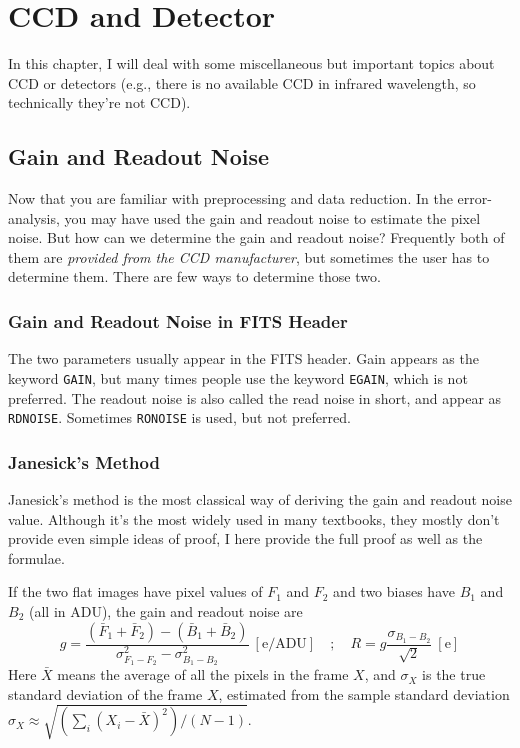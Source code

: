 \chapter{CCD and Detector}
In this chapter, I will deal with some miscellaneous but important topics about CCD or detectors (e.g., there is no available CCD in infrared wavelength, so technically they're not CCD). 

\section{Gain and Readout Noise}
Now that you are familiar with preprocessing and data reduction. In the error-analysis, you may have used the gain and readout noise to estimate the pixel noise. But how can we determine the gain and readout noise? Frequently both of them are \textit{provided from the CCD manufacturer}, but sometimes the user has to determine them. There are few ways to determine those two.

\subsection{Gain and Readout Noise in FITS Header}
The two parameters usually appear in the FITS header. Gain appears as the keyword \texttt{GAIN}, but many times people use the keyword \texttt{EGAIN}, which is not preferred. The readout noise is also called the read noise in short, and appear as \texttt{RDNOISE}. Sometimes \texttt{RONOISE} is used, but not preferred.

\subsection{Janesick's Method}
Janesick's method is the most classical way of deriving the gain and readout noise value. Although it's the most widely used in many textbooks, they mostly don't provide even simple ideas of proof, I here provide the full proof as well as the formulae.

\begin{thm} \label{thm: janesick method}
If the two flat images have pixel values of $ F_1 $ and $ F_2 $ and two biases have $ B_1 $ and $ B_2 $ (all in ADU), the gain and readout noise are
\begin{equation}\label{eq: janesick method}
  g = \frac{ (\bar{F}_1 + \bar{F}_2) - (\bar{B}_1 + \bar{B}_2)}{\sigma^2_{F_1 - F_2} - \sigma^2_{B_1 - B_2}} ~\mathrm{[e/ADU]}
  \quad;\quad
  R = g\frac{\sigma_{B_1 - B_2}}{\sqrt{2}} ~\mathrm{[e]}
\end{equation}
Here $ \bar{X} $ means the average of all the pixels in the frame $ X $, and $ \sigma_X $ is the true standard deviation of the frame $ X $, estimated from the sample standard deviation $ \sigma_X \approx \sqrt{(\sum_i (X_i - \bar{X})^2) / (N - 1)} $.
\end{thm}

